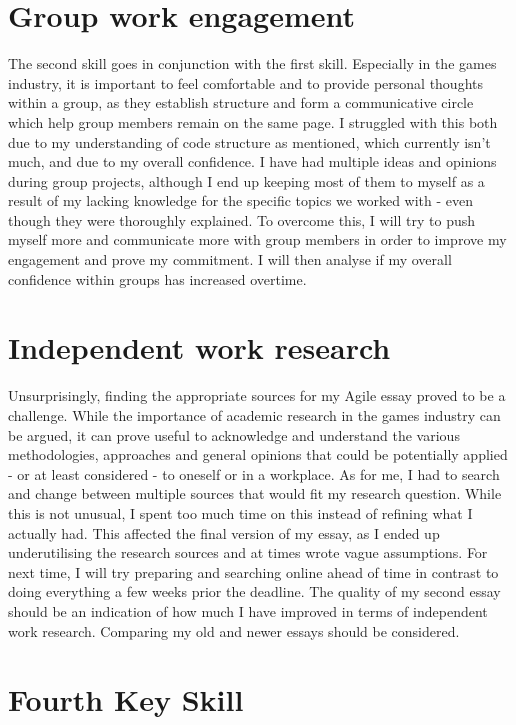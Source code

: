 \documentclass{scrartcl}
\begin{document}
\section{Group work engagement}
The second skill goes in conjunction with the first skill. Especially in the games industry, it is important to feel comfortable and to provide personal thoughts within a group, as they establish structure and form a communicative circle which help group members remain on the same page. I struggled with this both due to my understanding of code structure as mentioned, which currently isn't much, and due to my overall confidence. I have had multiple ideas and opinions during group projects, although I end up keeping most of them to myself as a result of my lacking knowledge for the specific topics we worked with - even though they were thoroughly explained. To overcome this, I will try to push myself more and communicate more with group members in order to improve my engagement and prove my commitment. I will then analyse if my overall confidence within groups has increased overtime. 

\section{Independent work research}
Unsurprisingly, finding the appropriate sources for my Agile essay proved to be a challenge. While the importance of academic research in the games industry can be argued, it can prove useful to acknowledge and understand the various methodologies, approaches and general opinions that could be potentially applied - or at least considered - to oneself or in a workplace. As for me, I had to search and change between multiple sources that would fit my research question. While this is not unusual, I spent too much time on this instead of refining what I actually had. This affected the final version of my essay, as I ended up underutilising the research sources and at times wrote vague assumptions. For next time, I will try preparing and searching online ahead of time in contrast to doing everything a few weeks prior the deadline. The quality of my second essay should be an indication of how much I have improved in terms of independent work research. Comparing my old and newer essays should be considered.

\section{Fourth Key Skill}
\end{document}
